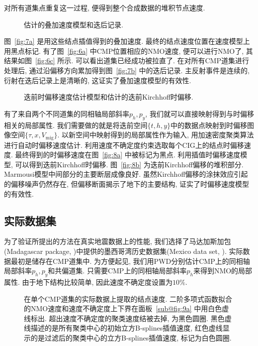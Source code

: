 对所有道集点重复这一过程, 便得到整个合成数据的堆积节点速度. 
\begin{figure}[htb]
    \centering
    \caption{估计的叠加速度模型和迭后记录. \label{fig:7}}
\end{figure}
图~\ref{fig:7a} 是用这些结点插值得到的叠加速度. 最终的结点速度位置在速度模型上用黑点标记. 有了图~\ref{fig:6a} 中CMP位置相应的NMO速度, 便可以进行NMO了, 其结果如图~\ref{fig:6c} 所示. 可以看出道集已经成功被拉直了. 在对所有CMP道集进行处理后, 通过沿偏移方向累加得到图~\ref{fig:7b} 中的迭后记录. 主反射事件是连续的, 衍射在迭后记录上是清晰的, 这证实了叠加速度模型的有效性. 
\begin{figure}[htb]
    \centering
    \caption{迭前时偏移速度估计模型和估计的迭前Kirchhoff时偏移. \label{fig:8}}
\end{figure}

有了来自两个不同道集的同相轴局部斜率$p_h, p_y$, 我们就可以直接映射得到与时偏移相关的局部属性. 我们需要做的就是将迭前空间$\{t,h,y\}$中的数据点映射到时偏移图像空间$\{\tau,x,V_{\mathrm{mig}}\}$. 以新空间中映射得到的局部属性作为输入, 用加速密度聚类算法进行自动时偏移速度估计. 利用速度不确定度约束选取每个CIG上的结点时偏移速度. 最终得到的时偏移速度在图~\ref{fig:8a} 中被标记为黑点. 利用插值时偏移速度模型, 可以得到迭前Kirchhoff时偏移. 图~\ref{fig:8b} 为迭前Kirchhoff偏移的堆积部分. Marmousi模型中间部分的主要断层成像良好. 虽然Kirchhoff偏移的涂抹效应引起的偏移噪声仍然存在, 但偏移断面揭示了地下的主要结构, 证实了时偏移速度模型的有效性. 
\subsection{实际数据集}
为了验证所提出的方法在真实地震数据上的性能, 我们选择了马达加斯加包(Madagascar package, \cite{Fomel2013})中提供的墨西哥湾历史数据集(Mexico data set, \cite{Claerbout1995}). 实际数据最初是储存在CMP道集中. 为方便起见, 我们用PWD分别估计CMP上的同相轴局部斜率$p_h, p_y$和共偏道集. 只需要CMP上的同相轴局部斜率$p_h$来得到NMO的局部属性. 由于地下结构比较简单, 因此速度不确定度设置为$10\%$. 
\begin{figure}[htb]
    \centering
    \caption{在单个CMP道集的实际数据上提取的结点速度. 二阶多项式函数拟合的NMO速度和速度不确定度上下界在面板~\ref{sub@fig:9a} 中用白色虚线标出. 超出速度不确定度的聚类速度结被去掉, 为黑色圆圈. 黑色虚线描述的是所有聚类中心的初始立方B-splines插值速度, 红色虚线显示的是过滤后的聚类中心的立方B-splines插值速度, 标记为白色圆圈. \label{fig:9}}
\end{figure}

